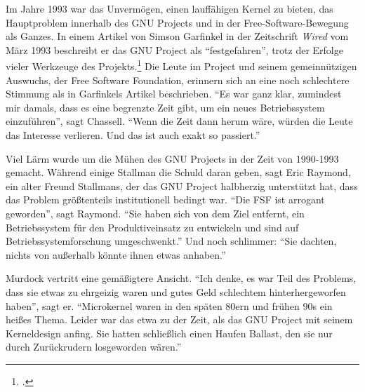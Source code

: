 Im Jahre 1993 war das Unvermögen, einen lauffähigen Kernel zu bieten, das Hauptproblem innerhalb des GNU Projects und in der Free-Software-Bewegung als Ganzes. In einem Artikel von Simson Garfinkel in der Zeitschrift \textit{Wired} vom März 1993 beschreibt er das GNU Project als "`festgefahren"', trotz der Erfolge vieler Werkzeuge des Projekts.\footcite[Vgl.][]{stalled} Die Leute im Project und seinem gemeinnützigen Auswuchs, der Free Software Foundation, erinnern sich an eine noch schlechtere Stimmung als in Garfinkels Artikel beschrieben. "`Es war ganz klar, zumindest mir damals, dass es eine begrenzte Zeit gibt, um ein neues Betriebssystem einzuführen"', sagt Chassell. "`Wenn die Zeit dann herum wäre, würden die Leute das Interesse verlieren. Und das ist auch exakt so passiert."'\footnotemark


Viel Lärm wurde um die Mühen des GNU Projects in der Zeit von 1990-1993 gemacht. Während einige Stallman die Schuld daran geben, sagt Eric Raymond, ein alter Freund Stallmans, der das GNU Project halbherzig unterstützt hat, dass das Problem größtenteils institutionell bedingt war. "`Die FSF ist arrogant geworden"', sagt Raymond. "`Sie haben sich von dem Ziel entfernt, ein Betriebssystem für den Produktiveinsatz zu entwickeln und sind auf Betriebssystemforschung umgeschwenkt."' Und noch schlimmer: "`Sie dachten, nichts von außerhalb könnte ihnen etwas anhaben."'

Murdock vertritt eine gemäßigtere Ansicht. "`Ich denke, es war Teil des Problems, dass sie etwas zu ehrgeizig waren und gutes Geld schlechtem hinterhergeworfen haben"', sagt er. "`Microkernel waren in den späten 80ern und frühen 90s ein heißes Thema. Leider war das etwa zu der Zeit, als das GNU Project mit seinem Kerneldesign anfing. Sie hatten schließlich einen Haufen Ballast, den sie nur durch Zurückrudern losgeworden wären."' 

